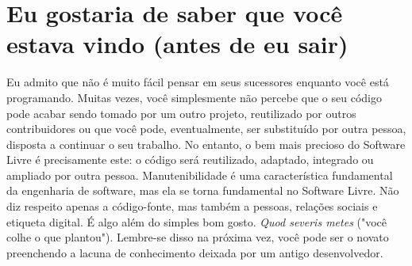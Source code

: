 \section*{Eu gostaria de saber que você estava vindo (antes de eu sair)}

Eu admito que não é muito fácil pensar em seus sucessores enquanto você está programando. 
Muitas vezes, você simplesmente não percebe que o seu código pode acabar sendo tomado por um
outro projeto, reutilizado por outros contribuidores ou que você pode, eventualmente, ser substituído
por outra pessoa, disposta a continuar o seu trabalho. No entanto, o bem mais precioso do
Software Livre é precisamente este: o código será reutilizado, adaptado, integrado ou ampliado
por outra pessoa. Manutenibilidade é uma característica fundamental da engenharia de software,
mas ela se torna fundamental no Software Livre. Não diz respeito apenas a código-fonte, 
mas também a pessoas, relações sociais e etiqueta digital. É algo além do simples bom gosto.
\textit{Quod severis metes} ("você colhe o que plantou"). Lembre-se disso na próxima vez, você
pode ser o novato preenchendo a lacuna de conhecimento deixada por um antigo desenvolvedor.
